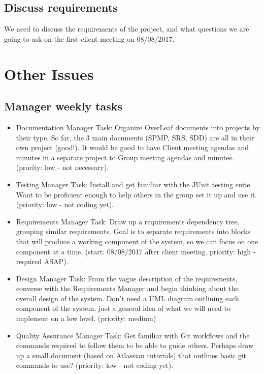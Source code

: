 \documentclass[11pt, a4paper]{article}
\begin{document}
\begin{flushleft}
  \subsection{Discuss requirements}
  We need to discuss the requirements of the project, and what questions we are going to ask on the first client meeting on 08/08/2017.

  \section{Other Issues}
  \subsection{Manager weekly tasks}
  \begin{itemize}
  \item Documentation Manager
  \linebreak Task: Organize OverLeaf documents into projects by their type. So far, the 3 main documents (SPMP, SRS, SDD) are all in their own project (good!). It would be good to have Client meeting agendas and minutes in a separate project to Group meeting agendas and minutes. (prority: low - not necessary).
  \item Testing Manager
  \linebreak Task: Install and get familiar with the JUnit testing suite. Want to be proficient enough to help others in the group set it up and use it. (priority: low - not coding yet).
  \item Requirements Manager
  \linebreak Task: Draw up a requirements dependency tree, grouping similar requirements. Goal is to separate requirements into blocks that will produce a working component of the system, so we can focus on one component at a time. (start: 08/08/2017 after client meeting. priority: high - required ASAP).
  \item Design Manager
  \linebreak Task: From the vague description of the requirements, converse with the Requirements Manager and begin thinking about the overall design of the system. Don't need a UML diagram outlining each component of the system, just a general idea of what we will need to implement on a low level. (priority: medium)
  \item Quality Assurance Manager
  \linebreak Task: Get familiar with Git workflows and the commands required to follow them to be able to guide others. Perhaps draw up a small document (based on Atlassian tutorials) that outlines basic git commands to use? (priority: low - not coding yet).

\end{itemize}
\end{flushleft}
\end{document}
